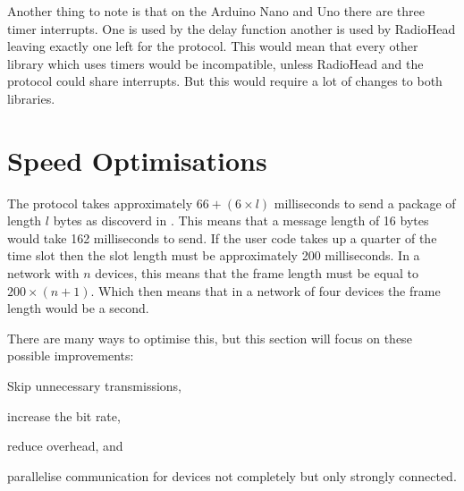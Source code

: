 Another thing to note is that on the Arduino Nano and Uno there are three timer interrupts.
One is used by the delay function another is used by RadioHead leaving exactly one left for the protocol.
This would mean that every other library which uses timers would be incompatible, unless RadioHead and the protocol could share interrupts.
But this would require a lot of changes to both libraries.

\section{Speed Optimisations}

The protocol takes approximately $66 + (6 \times l)$ milliseconds to send a package of length $l$ bytes as discoverd in . 
This means that a message length of 16 bytes would take 162 milliseconds to send.
If the user code takes up a quarter of the time slot then the slot length must be approximately 200 milliseconds.
In a network with $n$ devices, this means that the frame length must be equal to $200 \times (n + 1)$.
Which then means that in a network of four devices the frame length would be a second.

There are many ways to optimise this, but this section will focus on these possible improvements:
\begin{enumerate*}[label=\itshape \alph*\upshape)]
    \item Skip unnecessary transmissions,
    \item increase the bit rate, 
    \item reduce overhead, and
    \item parallelise communication for devices not completely but only strongly connected.
\end{enumerate*} 

